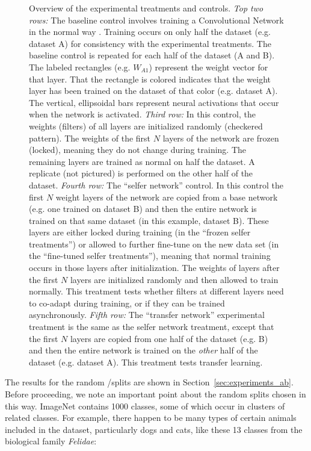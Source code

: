 \begin{figure}[htpb]
\caption{Overview of the experimental treatments and controls. \emph{Top two rows:} The baseline control involves training a Convolutional Network in the normal way \citep{Krizhevsky-2012}. Training occurs on only half the dataset (e.g. dataset A) for consistency with the experimental treatments. The baseline control is repeated for each half of the dataset (A and B). The labeled rectangles (e.g. $W_{A1}$) represent the weight vector for that layer. That the rectangle is colored indicates that the weight layer has been trained on the dataset of that color (e.g. dataset A). The vertical, ellipsoidal bars represent neural activations that occur when the network is activated. \emph{Third row:} In this control, the weights (filters) of all layers are initialized randomly (checkered pattern). The weights of the first $N$ layers of the network are frozen (locked), meaning they do not change during training. The remaining layers are trained as normal on half the dataset. A replicate (not pictured) is performed on the other half of the dataset. \emph{Fourth row:} The ``selfer network'' control. In this control the first $N$ weight layers of the network are copied from a base network (e.g. one trained on dataset B) and then the entire network is trained on that same dataset (in this example, dataset B). These layers are either locked during training (in the ``frozen selfer treatments'') or allowed to further fine-tune on the new data set (in the ``fine-tuned selfer treatments''), meaning that normal training occurs in those layers after initialization. The weights of layers after the first $N$ layers are initialized randomly and then allowed to train normally. This treatment tests whether filters at different layers need to co-adapt during training, or if they can be trained asynchronously. \emph{Fifth row:} The ``transfer network'' experimental treatment is the same as the selfer network treatment, except that the first $N$ layers are copied from one half of the dataset (e.g. B) and then the entire network is trained on the \emph{other} half of the dataset (e.g. dataset A). This treatment tests transfer learning.}
\label{fig:transfer}
\end{figure}


The results for the random \dA/\dB splits are shown in Section~\ref{sec:experiments_ab}. Before proceeding, we note an important point about the random splits chosen in this way. ImageNet contains 1000 classes, some of which occur in clusters of related classes. For example, there happen to be many types of certain animals included in the dataset, particularly dogs and cats, like these 13 classes from the biological family \emph{Felidae}:

